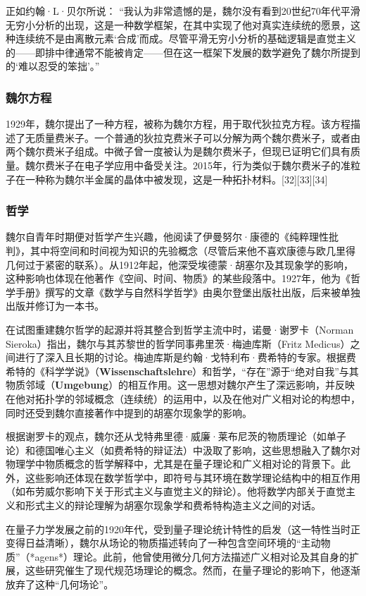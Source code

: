 正如约翰·L·贝尔所说：  
“我认为非常遗憾的是，魏尔没有看到20世纪70年代平滑无穷小分析的出现，这是一种数学框架，在其中实现了他对真实连续统的愿景，这种连续统不是由离散元素‘合成’而成。尽管平滑无穷小分析的基础逻辑是直觉主义的——即排中律通常不能被肯定——但在这一框架下发展的数学避免了魏尔所提到的‘难以忍受的笨拙’。”  
\subsubsection{魏尔方程} 
1929年，魏尔提出了一种方程，被称为魏尔方程，用于取代狄拉克方程。该方程描述了无质量费米子。一个普通的狄拉克费米子可以分解为两个魏尔费米子，或者由两个魏尔费米子组成。中微子曾一度被认为是魏尔费米子，但现已证明它们具有质量。魏尔费米子在电子学应用中备受关注。2015年，行为类似于魏尔费米子的准粒子在一种称为魏尔半金属的晶体中被发现，这是一种拓扑材料。[32][33][34]
\subsubsection{哲学}
魏尔自青年时期便对哲学产生兴趣，他阅读了伊曼努尔·康德的《纯粹理性批判》，其中将空间和时间视为知识的先验概念（尽管后来他不喜欢康德与欧几里得几何过于紧密的联系）。从1912年起，他深受埃德蒙·胡塞尔及其现象学的影响，这种影响也体现在他著作《空间、时间、物质》的某些段落中。1927年，他为《哲学手册》撰写的文章《数学与自然科学哲学》由奥尔登堡出版社出版，后来被单独出版并修订为一本书。  

在试图重建魏尔哲学的起源并将其整合到哲学主流中时，诺曼·谢罗卡（Norman Sieroka）指出，魏尔与其苏黎世的哲学同事弗里茨·梅迪库斯（Fritz Medicus）之间进行了深入且长期的讨论。梅迪库斯是约翰·戈特利布·费希特的专家。根据费希特的《科学学说》（\textbf{Wissenschaftslehre}）和哲学，“存在”源于“绝对自我”与其物质邻域（\textbf{Umgebung}）的相互作用。这一思想对魏尔产生了深远影响，并反映在他对拓扑学的邻域概念（连续统）的运用中，以及在他对广义相对论的构想中，同时还受到魏尔直接著作中提到的胡塞尔现象学的影响。  

根据谢罗卡的观点，魏尔还从戈特弗里德·威廉·莱布尼茨的物质理论（如单子论）和德国唯心主义（如费希特的辩证法）中汲取了影响，这些思想融入了魏尔对物理学中物质概念的哲学解释中，尤其是在量子理论和广义相对论的背景下。此外，这些影响还体现在数学哲学中，即符号与其环境在数学理论结构中的相互作用（如布劳威尔影响下关于形式主义与直觉主义的辩论）。他将数学内部关于直觉主义和形式主义的辩论理解为胡塞尔现象学和费希特构造主义之间的对话。  

在量子力学发展之前的1920年代，受到量子理论统计特性的启发（这一特性当时正变得日益清晰），魏尔从场论的物质描述转向了一种包含空间环境的“主动物质”（*agens*）理论。此前，他曾使用微分几何方法描述广义相对论及其自身的扩展，这些研究催生了现代规范场理论的概念。然而，在量子理论的影响下，他逐渐放弃了这种“几何场论”。  

